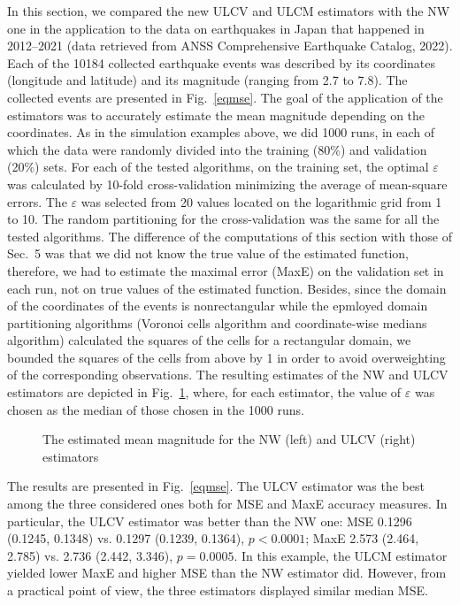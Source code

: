 \documentclass[12pt]{article}
\theoremstyle{remark}
\begin{document}
In this section, we compared the new ULCV and ULCM estimators with the NW one in the application to the data on earthquakes in Japan that happened in 2012--2021 (data retrieved from ANSS Comprehensive Earthquake Catalog, 2022). Each of the 10184 collected earthquake events was described by its coordinates (longitude and latitude) and its magnitude (ranging from 2.7 to 7.8).
The collected events are presented in Fig.~\ref{eqmse}.
The goal of the application of the estimators was to accurately estimate the mean magnitude depending on the coordinates.
As in the simulation examples above, we did 1000 runs, in each of which the data were randomly divided into the training (80\%) and validation (20\%) sets. For each of the tested algorithms, on the training set, the optimal $\varepsilon$ was calculated by 10-fold cross-validation minimizing the average of mean-square errors.
The $\varepsilon$ was selected from 20 values located on the logarithmic grid from 1 to 10.
The random partitioning for the cross-validation was the same for all the tested algorithms.
The difference of the computations of this section with those of Sec.~5 was that we did not know the true value of the estimated function, therefore, we had to estimate the maximal error (MaxE) on the validation set in each run, not on true values of the estimated function.
Besides, since the domain of the coordinates of the events is nonrectangular while the epmloyed domain partitioning algorithms (Voronoi cells algorithm and coordinate-wise medians algorithm) calculated the squares of the cells for a rectangular domain, we bounded the squares of the cells from above by 1 in order to avoid overweighting of the corresponding observations. The resulting estimates of the NW and ULCV estimators are depicted in Fig.~\ref{eq7est}, where, for each estimator, the value of $\varepsilon$ was chosen as the median of those chosen in the 1000 runs.


\begin{figure}[!h]
    \centering
    \vspace{-12pt}
    \caption{The estimated mean magnitude for the NW (left) and ULCV (right) estimators}  \label{eq7est}
\end{figure}




The results are presented in Fig.~\ref{eqmse}. The ULCV estimator was the best among the three considered ones both for MSE and MaxE accuracy measures. In particular, the ULCV estimator was better than the NW one: MSE
 0.1296  (0.1245,    0.1348) vs.
0.1297   (0.1239,    0.1364),  $p<0.0001$;
MaxE
2.573   (2.464,   2.785) vs.
2.736   (2.442,    3.346), $p=0.0005$.
In this example, the ULCM estimator yielded lower MaxE and higher MSE than the NW estimator did.
However, from a practical point of view, the three estimators displayed similar median MSE.
\end{document}
